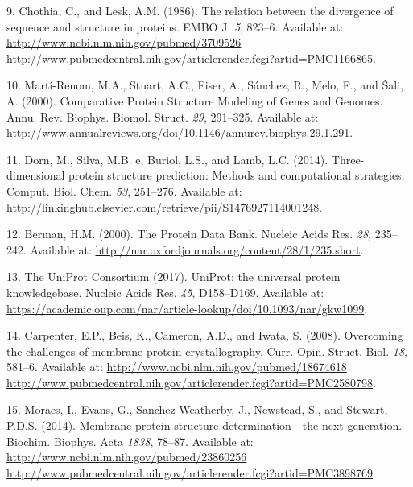 \documentclass[11pt,a4paper,twoside]{book}
\theoremstyle{definition}
\theoremstyle{definition}
\theoremstyle{remark}
\begin{document}
\hypertarget{ref-Chothia1986}{}
9. Chothia, C., and Lesk, A.M. (1986). The relation between the
divergence of sequence and structure in proteins. EMBO J. \emph{5},
823--6. Available at:
\href{http://www.ncbi.nlm.nih.gov/pubmed/3709526\%20http://www.pubmedcentral.nih.gov/articlerender.fcgi?artid=PMC1166865}{http://www.ncbi.nlm.nih.gov/pubmed/3709526 http://www.pubmedcentral.nih.gov/articlerender.fcgi?artid=PMC1166865}.

\hypertarget{ref-Marti-Renom2000}{}
10. Martí-Renom, M.A., Stuart, A.C., Fiser, A., Sánchez, R., Melo, F.,
and Šali, A. (2000). Comparative Protein Structure Modeling of Genes and
Genomes. Annu. Rev. Biophys. Biomol. Struct. \emph{29}, 291--325.
Available at:
\url{http://www.annualreviews.org/doi/10.1146/annurev.biophys.29.1.291}.

\hypertarget{ref-Dorn2014}{}
11. Dorn, M., Silva, M.B. e, Buriol, L.S., and Lamb, L.C. (2014).
Three-dimensional protein structure prediction: Methods and
computational strategies. Comput. Biol. Chem. \emph{53}, 251--276.
Available at:
\url{http://linkinghub.elsevier.com/retrieve/pii/S1476927114001248}.

\hypertarget{ref-Berman2000}{}
12. Berman, H.M. (2000). The Protein Data Bank. Nucleic Acids Res.
\emph{28}, 235--242. Available at:
\url{http://nar.oxfordjournals.org/content/28/1/235.short}.

\hypertarget{ref-TheUniProtConsortium2017}{}
13. The UniProt Consortium (2017). UniProt: the universal protein
knowledgebase. Nucleic Acids Res. \emph{45}, D158--D169. Available at:
\url{https://academic.oup.com/nar/article-lookup/doi/10.1093/nar/gkw1099}.

\hypertarget{ref-Carpenter2008}{}
14. Carpenter, E.P., Beis, K., Cameron, A.D., and Iwata, S. (2008).
Overcoming the challenges of membrane protein crystallography. Curr.
Opin. Struct. Biol. \emph{18}, 581--6. Available at:
\href{http://www.ncbi.nlm.nih.gov/pubmed/18674618\%20http://www.pubmedcentral.nih.gov/articlerender.fcgi?artid=PMC2580798}{http://www.ncbi.nlm.nih.gov/pubmed/18674618 http://www.pubmedcentral.nih.gov/articlerender.fcgi?artid=PMC2580798}.

\hypertarget{ref-Moraes2014}{}
15. Moraes, I., Evans, G., Sanchez-Weatherby, J., Newstead, S., and
Stewart, P.D.S. (2014). Membrane protein structure determination - the
next generation. Biochim. Biophys. Acta \emph{1838}, 78--87. Available
at:
\href{http://www.ncbi.nlm.nih.gov/pubmed/23860256\%20http://www.pubmedcentral.nih.gov/articlerender.fcgi?artid=PMC3898769}{http://www.ncbi.nlm.nih.gov/pubmed/23860256 http://www.pubmedcentral.nih.gov/articlerender.fcgi?artid=PMC3898769}.
\end{document}
